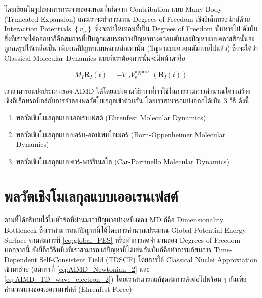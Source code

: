 \noindent โดยเขียนในรูปของการกระจายของเทอมที่เกิดจาก Contribution แบบ Many-Body (Truncated Expansion) และเราจะทำการแทน
Degrees of Freedom เชิงอิเล็กทรอนิกส์ด้วย Interaction Potentials $\left\{v_n\right\}$ ซึ่งจะทำให้เทอมที่เป็น Degrees of
Freedom นั้นหายไป ดังนั้นสิ่งที่เราจะได้ออกมาก็คือสมการที่เป็นลูกผสมระหว่างปัญหาทางควอนตัมและปัญหาแบบคลาสสิกนั้นจะถูกลดรูปให้เหลือเป็น%
เพียงแค่ปัญหาแบบคลาสสิกเท่านั้น (ปัญหาแบบควอนตัมหายไปแล้ว) ซึ่งจะได้ว่า Classical Molecular Dynamics แบบที่เราต้องการนั้นจะมีหน้าตาคือ

\begin{equation}
  M_I \ddot{\mathbf{R}}_I(t)
  =
  -\nabla_I V_{\mathrm{e}}^{\text{approx }}\left(\mathbf{R}_I(t)\right)
\end{equation}

เราสามารถแบ่งประเภทของ AIMD ได้โดยแบ่งตามวิธีการที่เราใช้ในการรวมการคำนวณโครงสร้างเชิงอิเล็กทรอนิกส์กับการจำลองพลวัตโมเลกุลเข้าด้วยกัน
โดยเราสามารถแบ่งออกได้เป็น 3 วิธี ดังนี้

\begin{enumerate}[topsep=0pt,noitemsep]
  \setlength\itemsep{1em}
  \item พลวัตเชิงโมเลกุลแบบเออเรนเฟสต์ (Ehrenfest Molecular Dynamics)

  \item พลวัตเชิงโมเลกุลแบบบอร์น-ออปเพนไฮเมอร์ (Born-Oppenheimer Molecular Dynamics)

  \item พลวัตเชิงโมเลกุลแบบคาร์-พาร์ริเนลโล (Car-Parrinello Molecular Dynamics)
\end{enumerate}

\section{พลวัตเชิงโมเลกุลแบบเออเรนเฟสต์}

ตามที่ได้อธิบายไว้ในหัวข้อที่ผ่านมาว่าปัญหาอย่างหนึ่งของ MD ก็คือ Dimensionality Bottleneck ซึ่งเราสามารถแก้ปัญหานี้ได้โดยการคำนวณประมาณ
Global Potential Energy Surface ตามสมการที่ \eqref{eq:global_PES} หรือทำการลดจำนวนของ Degrees of Freedom นอกจากนี้
ยังมีอีกวิธีหนึ่งที่เราสามารถแก้ปัญหานี้ได้เช่นกันนั่นก็คือทำการแก้สมการ Time-Dependent Self-Consistent Field (TDSCF) โดยการใช้
Classical Nuclei Approxiation เข้ามาช่วย (สมการที่ \eqref{eq:AIMD_Newtonian_2} และ \eqref{eq:AIMD_TD_wave_electron_2})
โดยเราสามารถแก้ชุดสมการดังต่อไปพร้อม ๆ กันเพื่อคำนวณแรงของเออเรนเฟสต์ (Ehrenfest Force)

